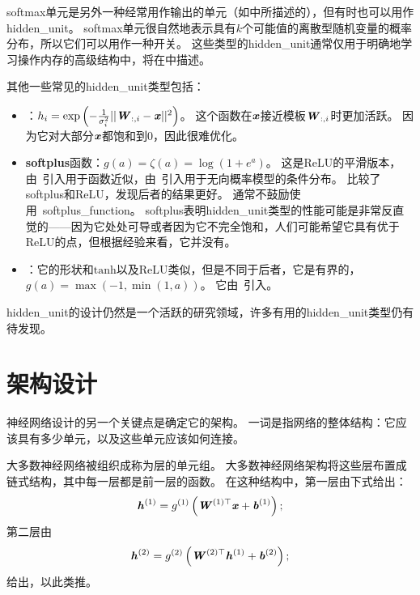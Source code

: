 

softmax单元是另外一种经常用作输出的单元（如中所描述的），但有时也可以用作\gls{hidden_unit}。
softmax单元很自然地表示具有$k$个可能值的离散型随机变量的概率分布，所以它们可以用作一种开关。
这些类型的\gls{hidden_unit}通常仅用于明确地学习操作内存的高级结构中，将在中描述。

其他一些常见的\gls{hidden_unit}类型包括：
\begin{itemize}
\item {}：$h_i = \exp \left (-\frac{1}{\sigma_i^2}|| \boldsymbol{\mathit{W}}_{:,i}-\boldsymbol{\mathit{x}}||^2 \right )$。
这个函数在$\boldsymbol{\mathit{x}}$接近模板$\boldsymbol{\mathit{W}}_{:,i}$时更加活跃。
因为它对大部分$\boldsymbol{\mathit{x}}$都饱和到0，因此很难优化。

\item \textbf{\gls{softplus}}函数：$g(a)=\zeta(a)=\log(1+e^a)$。
这是\gls{ReLU}的平滑版本，由~\cite{Dugas01}引入用于函数近似，由~\cite{Nair-2010-small}引入用于无向概率模型的条件分布。
\cite{Glorot+al-AI-2011-small}比较了softplus和\gls{ReLU}，发现后者的结果更好。
通常不鼓励使用~\gls{softplus_function}。
softplus表明\gls{hidden_unit}类型的性能可能是非常反直觉的——因为它处处可导或者因为它不完全饱和，人们可能希望它具有优于\gls{ReLU}的点，但根据经验来看，它并没有。

\item {}：它的形状和$\text{tanh}$以及\gls{ReLU}类似，但是不同于后者，它是有界的，$g(a)=\max(-1, \min(1,a))$。
它由~\cite{Collobert04}引入。
\end{itemize}

\gls{hidden_unit}的设计仍然是一个活跃的研究领域，许多有用的\gls{hidden_unit}类型仍有待发现。

\section{架构设计}
\label{sec:architecture_design}

神经网络设计的另一个关键点是确定它的架构。
一词是指网络的整体结构：它应该具有多少单元，以及这些单元应该如何连接。


大多数神经网络被组织成称为层的单元组。
大多数神经网络架构将这些层布置成链式结构，其中每一层都是前一层的函数。
在这种结构中，第一层由下式给出：
\begin{equation}
\boldsymbol{\mathit{h}}^{(1)}= g^{(1)}\left ( \boldsymbol{\mathit{W}}^{(1)\top} \boldsymbol{\mathit{x}} + \boldsymbol{\mathit{b}}^{(1)}\right );
\end{equation}
第二层由
\begin{equation}
\boldsymbol{\mathit{h}}^{(2)} = g^{(2)}\left ( \boldsymbol{\mathit{W}}^{(2)\top}\boldsymbol{\mathit{h}}^{(1)}+\boldsymbol{\mathit{b}}^{(2)} \right );
\end{equation}
给出，以此类推。

